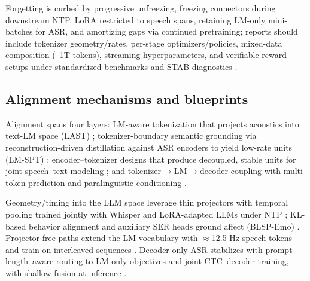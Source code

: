 \documentclass{article}
\begin{document}
Forgetting is curbed by progressive unfreezing, freezing connectors during downstream NTP, LoRA restricted to speech spans, retaining LM-only mini-batches for ASR, and amortizing gaps via continued pretraining; reports should include tokenizer geometry/rates, per-stage optimizers/policies, mixed-data composition (~1T tokens), streaming hyperparameters, and verifiable-reward setups under standardized benchmarks and STAB diagnostics \cite{nguyen2025qwenvsgemmaintegrationwhispercomparative,hsu2024exploringcontextlearningtextlessspeechla,zeng2024scalingspeechtextpretrainingsyntheticint,vashishth2024stabspeechtokenizerassessmentbenchmark,entry2025indicsuperbspeechprocessinguniversalperf,sadok2025vectorquantizedmaskedautoencoderaudiovis,wang2025tadicodectextawarediffusionspeechtokeniz}.

\subsection{Alignment mechanisms and blueprints} \label{subsec:alignmentmechanismsandblueprints}
Alignment spans four layers: LM-aware tokenization that projects acoustics into text-LM space (LAST) \cite{turetzky2024lastlanguagemodelawarespeechtokenization}; tokenizer-boundary semantic grounding via reconstruction-driven distillation against ASR encoders to yield low-rate units (LM-SPT) \cite{jo2025lmsptalignedsemanticdistillationspeechto}; encoder--tokenizer designs that produce decoupled, stable units for joint speech--text modeling \cite{entry2025towardjointlanguagemodelingspeechunitste}; and tokenizer$\rightarrow$LM$\rightarrow$decoder coupling with multi-token prediction and paralinguistic conditioning \cite{fan2025whatmakesgoodspeechtokenizerllmcentricge,wang2025incorporatingcontextualparalinguisticund}.

Geometry/timing into the LLM space leverage thin projectors with temporal pooling trained jointly with Whisper and LoRA-adapted LLMs under NTP \cite{nguyen2025qwenvsgemmaintegrationwhispercomparative}; KL-based behavior alignment and auxiliary SER heads ground affect (BLSP-Emo) \cite{wang2024blspemotowardsempatheticlargespeechlangu}. Projector-free paths extend the LM vocabulary with $\approx$12.5 Hz speech tokens and train on interleaved sequences \cite{zeng2024scalingspeechtextpretrainingsyntheticint}. Decoder-only ASR stabilizes with prompt-length--aware routing to LM-only objectives and joint CTC--decoder training, with shallow fusion at inference \cite{tsunoo2024decoderonlyarchitecturespeechrecognition}.
\end{document}
